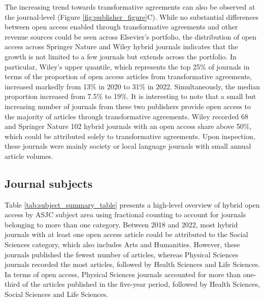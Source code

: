 \documentclass[a4paper,man,floatsintext,longtable,noextraspace,12pt]{apa6}
\begin{document}
The increasing trend towards transformative agreements can also be
observed at the journal-level (Figure \ref{fig:publisher_figure}C).
While no substantial differences between open access enabled through
transformative agreements and other revenue sources could be seen across
Elsevier's portfolio, the distribution of open access across Springer
Nature and Wiley hybrid journals indicates that the growth is not
limited to a few journals but extends across the portfolio. In
particular, Wiley's upper quantile, which represents the top 25\% of
journals in terms of the proportion of open access articles from
transformative agreements, increased markedly from 13\% in 2020 to 31\%
in 2022. Simultaneously, the median proportion increased from 7.5\% to
19\%. It is interesting to note that a small but increasing number of
journals from these two publishers provide open access to the majority
of articles through transformative agreements. Wiley recorded 68 and
Springer Nature 102 hybrid journals with an open access share above
50\%, which could be attributed solely to transformative agreements.
Upon inspection, these journals were mainly society or local language
journals with small annual article volumes.

\subsection{Journal subjects}\label{journal-subjects}

Table \ref{tab:subject_summary_table} presents a high-level overview of
hybrid open access by ASJC subject area using fractional counting to
account for journals belonging to more than one category. Between 2018
and 2022, most hybrid journals with at least one open access article
could be attributed to the Social Sciences category, which also includes
Arts and Humanities. However, these journals published the fewest number
of articles, whereas Physical Sciences journals recorded the most
articles, followed by Health Sciences and Life Sciences. In terms of
open access, Physical Sciences journals accounted for more than
one-third of the articles published in the five-year period, followed by
Health Sciences, Social Sciences and Life Sciences.
\end{document}
